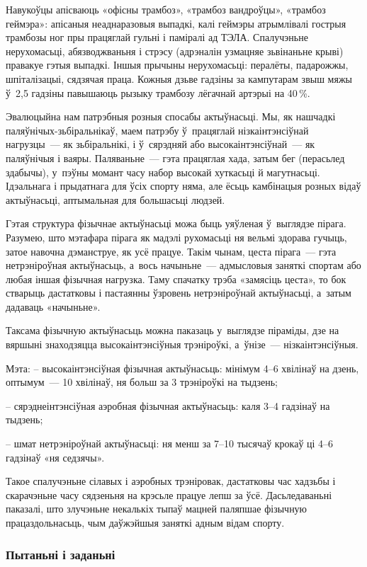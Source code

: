Навукоўцы апісваюць «офісны трамбоз», «трамбоз вандроўцы», «трамбоз геймэра»: апісаныя неаднаразовыя выпадкі, калі геймэры атрымлівалі гострыя трамбозы ног пры працяглай гульні і паміралі ад ТЭЛА. Спалучэньне нерухомасьці, абязводжваньня і стрэсу (адрэналін узмацняе зьвінаньне крыві) правакуе гэтыя выпадкі. Іншыя прычыны нерухомасьці: пералёты, падарожжы, шпіталізацыі, сядзячая праца. Кожныя дзьве гадзіны за кампутарам звыш мяжы ў~2,5 гадзіны павышаюць рызыку трамбозу лёгачнай артэрыі на 40\,\%.

Эвалюцыйна нам патрэбныя розныя спосабы актыўнасьці. Мы, як нашчадкі паляўнічых-зьбіральнікаў, маем патрэбу ў~працяглай нізкаінтэнсіўнай нагрузцы~--- як зьбіральнікі, і ў~сярэдняй або высокаінтэнсіўнай~--- як паляўнічыя і ваяры. Паляваньне~--- гэта працяглая хада, затым бег (перасьлед здабычы), у~пэўны момант часу набор высокай хуткасьці й магутнасьці. Ідэальнага і прыдатнага для ўсіх спорту няма, але ёсьць камбінацыя розных відаў актыўнасьці, аптымальная для большасьці людзей.

Гэтая структура фізычнае актыўнасьці можа быць уяўленая ў~выглядзе пірага. Разумею, што мэтафара пірага як мадэлі рухомасьці ня вельмі здорава гучыць, затое навочна дэманструе, як усё працуе. Такім чынам, цеста пірага~--- гэта нетрэніроўная актыўнасьць, а~вось начыньне~--- адмысловыя заняткі спортам або любая іншая фізычная нагрузка. Таму спачатку трэба «замясіць цеста», то бок стварыць дастатковы і пастаянны ўзровень нетрэніроўнай актыўнасьці, а~затым дадаваць «начыньне».

Таксама фізычную актыўнасьць можна паказаць у~выглядзе піраміды, дзе на вяршыні знаходзяцца высокаінтэнсіўныя трэніроўкі, а~ўнізе~--- нізкаінтэнсіўныя.

Мэта:
– высокаінтэнсіўная фізычная актыўнасьць: мінімум 4--6 хвілінаў на дзень, оптымум~--- 10 хвілінаў, ня больш за 3 трэніроўкі на тыдзень; 

– сярэднеінтэнсіўная аэробная фізычная актыўнасьць: каля 3--4 гадзінаў на тыдзень;

– шмат нетрэніроўнай актыўнасьці: ня менш за 7--10 тысячаў крокаў ці 4--6 гадзінаў «ня седзячы».

Такое спалучэньне сілавых і аэробных трэніровак, дастатковы час хадзьбы і скарачэньне часу сядзеньня на крэсьле працуе лепш за ўсё. Дасьледаваньні паказалі, што злучэньне некалькіх тыпаў мацней паляпшае фізычную працаздольнасьць, чым даўжэйшыя заняткі адным відам спорту.

\subsubsection{Пытаньні і заданьні}

